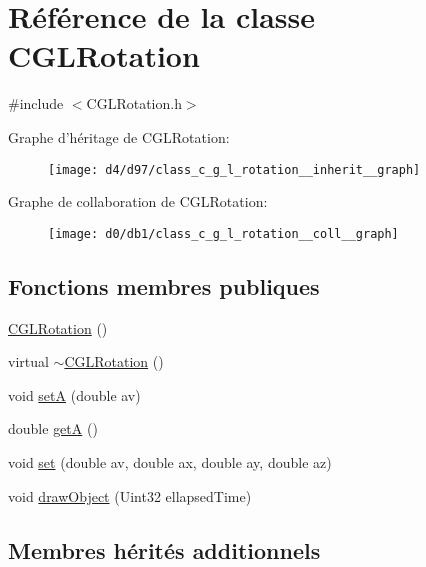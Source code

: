 \hypertarget{class_c_g_l_rotation}{\section{Référence de la classe C\-G\-L\-Rotation}
\label{class_c_g_l_rotation}
}


{\ttfamily \#include $<$C\-G\-L\-Rotation.\-h$>$}



Graphe d'héritage de C\-G\-L\-Rotation\-:
\nopagebreak
\begin{figure}[H]
\begin{center}
\leavevmode
\texttt{[image: d4/d97/class\_c\_g\_l\_rotation\_\_inherit\_\_graph]}
\end{center}
\end{figure}


Graphe de collaboration de C\-G\-L\-Rotation\-:
\nopagebreak
\begin{figure}[H]
\begin{center}
\leavevmode
\texttt{[image: d0/db1/class\_c\_g\_l\_rotation\_\_coll\_\_graph]}
\end{center}
\end{figure}
\subsection*{Fonctions membres publiques}
\begin{DoxyCompactItemize}
\item 
\hyperlink{class_c_g_l_rotation_a00f328e9aeefa148e4bd169afc5cb959}{C\-G\-L\-Rotation} ()
\item 
virtual \hyperlink{class_c_g_l_rotation_adc90213d4008b9beb3c8e266f952a509}{$\sim$\-C\-G\-L\-Rotation} ()
\item 
void \hyperlink{class_c_g_l_rotation_a690f30f8f121b27ac22d6b02a6443b58}{set\-A} (double av)
\item 
double \hyperlink{class_c_g_l_rotation_a0d836220b7b39ee00173ee4e0bb4da92}{get\-A} ()
\item 
void \hyperlink{class_c_g_l_rotation_a2b767e088f36ceef91e7259c76f7390e}{set} (double av, double ax, double ay, double az)
\item 
void \hyperlink{class_c_g_l_rotation_a94be2c089fbe52d0f8cb33ee98f8de74}{draw\-Object} (Uint32 ellapsed\-Time)
\end{DoxyCompactItemize}
\subsection*{Membres hérités additionnels}


